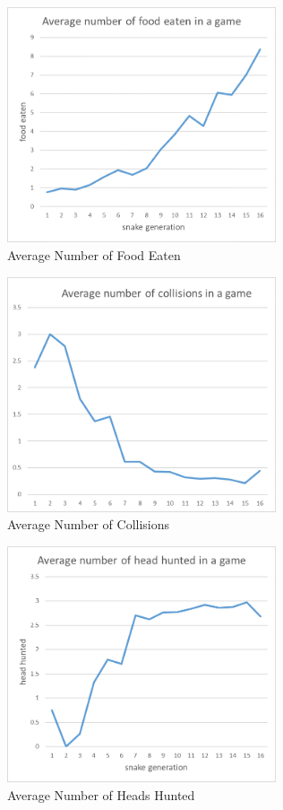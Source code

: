 \documentclass{article}
\begin{document}
\begin{figure}[!ht]
  \centering
  \includegraphics[width=300px]{food_eaten}
  \caption{Average Number of Food Eaten}
  \label{fig:food_eaten}
\end{figure}
\FloatBarrier

\begin{figure}[!ht]
  \centering
  \includegraphics[width=300px]{collisions}
  \caption{Average Number of Collisions}
  \label{fig:collisions}
\end{figure}
\FloatBarrier

\begin{figure}[!ht]
  \centering
  \includegraphics[width=300px]{heads_hunted}
  \caption{Average Number of Heads Hunted}
  \label{fig:heads_hunted}
\end{figure}
\FloatBarrier
\end{document}
